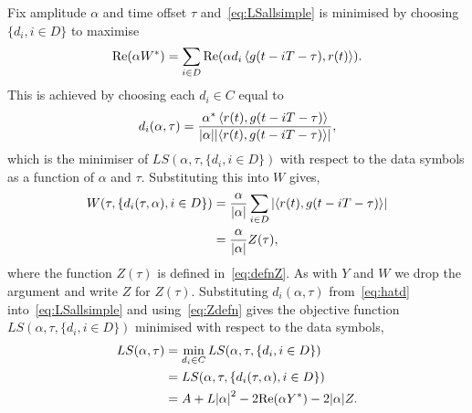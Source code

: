 \documentclass[journal]{IEEEtranTCOM}
\begin{document}
Fix amplitude $\alpha$ and time offset $\tau$ and~\eqref{eq:LSallsimple} is minimised by choosing $\{ d_i , i \in D\}$ to maximise 
\[
\mathrm{Re}(\alpha W^*) = \sum_{i \in D} \mathrm{Re}(\alpha d_i\left\langle g(t - iT - \tau) , r(t) \right\rangle).
\]
This is achieved by choosing each $d_i \in C$ equal to
\begin{equation}\label{eq:hatd}
d_i(\alpha, \tau) = \frac{\alpha^* \dotprod{r(t)}{g(t - iT - \tau)}}{\abs{\alpha} \abs{\dotprod{r(t)}{g(t - iT - \tau)}}},
\end{equation}
which is the minimiser of $LS(\alpha,\tau,\{d_i, i \in D\})$ with respect to the data symbols as a function of $\alpha$ and $\tau$.  Substituting this into $W$ gives,
\begin{align}
W(\tau, \{d_i(\tau,\alpha), i \in D\})  &= \frac{\alpha}{\abs{\alpha}}\sum_{i \in D} \abs{\dotprod{r(t)}{g(t - iT - \tau)}} \nonumber \\
&= \frac{\alpha}{\abs{\alpha}}Z(\tau), \label{eq:Zdefn}
\end{align}
where the function $Z(\tau)$ is defined in~\eqref{eq:defnZ}.  As with $Y$ and $W$ we drop the argument and write $Z$ for $Z(\tau)$.  Substituting $d_i(\alpha, \tau)$ from~\eqref{eq:hatd} into~\eqref{eq:LSallsimple} and using~\eqref{eq:Zdefn} gives the objective function $LS(\alpha,\tau,\{d_i, i \in D\})$ minimised with respect to the data symbols, 
\begin{align}
LS(\alpha, \tau) &= \min_{d_i \in C} LS(\alpha,\tau,\{d_i, i \in D\}) \nonumber \\
&= LS(\alpha, \tau, \{d_i(\tau,\alpha), i \in D\}) \nonumber  \\
&=A  + L \abs{\alpha}^2 - 2\re(\alpha Y^*) - 2\abs{\alpha}Z. \label{eq:LSalphatau}
\end{align}
\end{document}

